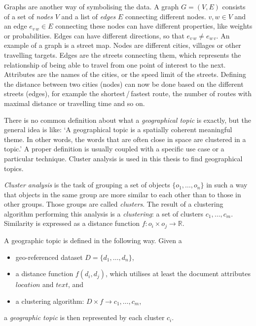 Graphs are another way of symbolising the data. A graph $G = (V, E)$ consists of a set of \emph{nodes} $V$ and a list of \emph{edges} $E$ connecting different nodes. $v, w \in V$ and an edge $e_{v\,w} \in E$ connecting these nodes can have different properties, like weights or probabilities. Edges can have different directions, so that $e_{v\,w} \neq e_{w\,v}$. An example of a graph is a street map. Nodes are different cities, villages or other travelling targets. Edges are the streets connecting them, which represents the relationship of being able to travel from one point of interest to the next. Attributes are the names of the cities, or the speed limit of the streets. Defining the distance between two cities (nodes) can now be done based on the different streets (edges), for example the shortest\,/\,fastest route, the number of routes with maximal distance or travelling time and so on.

There is no common definition about what a \emph{geographical topic} is exactly, but the general idea is like: \enquote*{A geographical topic is a spatially coherent meaningful theme. In other words, the words that are often close in space are clustered in a topic.}\cite{Yin2011} A proper definition is usually coupled with a specific use case or a particular technique. Cluster analysis is used in this thesis to find geographical topics.

\emph{Cluster analysis} is the task of grouping a set of objects $\{o_1, \dots, o_n\}$ in such a way that objects in the same group are more similar to each other than to those in other groups. Those groups are called \emph{clusters}. The result of a clustering algorithm performing this analysis is a \emph{clustering}: a set of clusters $c_1, \dots, c_m$. Similarity is expressed as a distance function $f: o_i \times o_j \rightarrow \mathbb{R}$.

\vspace{.5em}
\noindent
A geographic topic is defined in the following way. Given a 
\begin{itemize}
\item geo-referenced dataset $D=\{d_1,\dots, d_n\}$, 
\item a distance function $f(d_i, d_j)$, which utilises at least the document attributes $location$ and $text$, and 
\item a clustering algorithm: $D \times f \rightarrow c_1, \dots, c_m$, 
\end{itemize}
a \emph{geographic topic} is then represented by each cluster $c_i$.


